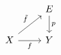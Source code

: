 \documentclass{article}
\begin{document}
    \begin{equation*}
        \begin{tikzcd}
            & E \ar[d, "p"] \\
            X \ar[r, "f"'] \ar[ur, "\tilde{f}"] & Y
        \end{tikzcd}
    \end{equation*}
\end{document}
